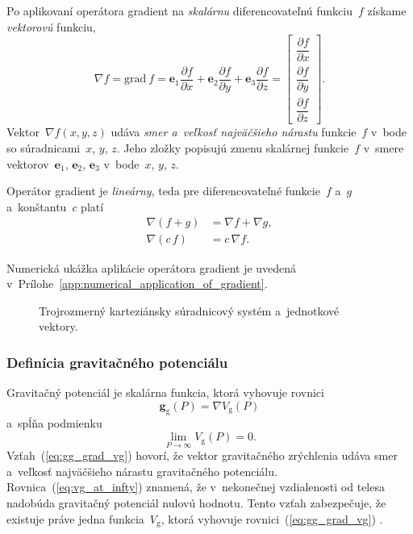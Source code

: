\documentclass[a4paper, 12pt]{book}
\newcommand{\grad}{\mathrm{grad}}
\newcommand{\gidx}{\mathrm g}
\let\vec\mathbf
\begin{document}
Po aplikovaní operátora gradient na \emph{skalárnu} diferencovateľnú 
funkciu~$f$ získame \emph{vektorovú} funkciu,
%
\begin{equation}
\nabla f = \grad \ f = \vec e_1 \frac{\partial f}{\partial x} + \vec e_2 
\frac{\partial
f}{\partial y} + \vec e_3 \frac{\partial f}{\partial z} =
\begin{bmatrix}
\dfrac{\partial f}{\partial x} \\[2ex]
\dfrac{\partial f}{\partial y} \\[2ex]
\dfrac{\partial f}{\partial z}
\end{bmatrix}
{.}
\end{equation}
%
Vektor~$\nabla f(x, y, z)$ udáva \emph{smer a~veľkosť najväčšieho nárastu} 
funkcie~$f$ v~bode so súradnicami~$x$, $y$, $z$.  Jeho zložky popisujú zmenu 
skalárnej funkcie~$f$ v~smere vektorov~$\vec e_1$, $\vec e_2$, $\vec e_3$ 
v~bode~$x$, $y$, $z$.

Operátor gradient je \emph{lineárny}, teda pre diferencovateľné funkcie~$f$ 
a~$g$ a~konštantu~$c$ platí
%
\begin{align}
\label{eq:gradient_additivity}
\nabla \left(f + g \right) &= \nabla f + \nabla g{,}\\
%
\label{eq:gradient_homogenity}
\nabla (c \, f) &= c \, \nabla f{.}
\end{align}

Numerická ukážka aplikácie operátora gradient je uvedená 
v~Prílohe~\ref{app:numerical_application_of_gradient}.

\begin{figure}
\centering

\caption{Trojrozmerný karteziánsky súradnicový systém a~jednotkové vektory.}
\label{fig:3d_coord_system}
\end{figure}

\subsubsection{Definícia gravitačného potenciálu}

Gravitačný potenciál je skalárna funkcia, ktorá vyhovuje rovnici 
\parencite{SansoGeoidDetermination}
%
\begin{equation}
\label{eq:gg_grad_vg}
\vec g_\gidx(P) = \nabla V_\gidx(P)
\end{equation}
%
a~spĺňa podmienku
%
\begin{equation}
\label{eq:vg_at_infty}
\lim_{P \to \infty} V_\gidx(P) = 0{.}
\end{equation}
%
Vzťah~(\ref{eq:gg_grad_vg}) hovorí, že vektor gravitačného zrýchlenia udáva 
smer a~veľkosť najväčšieho nárastu gravitačného potenciálu.  
Rovnica~(\ref{eq:vg_at_infty}) znamená, že v~nekonečnej vzdialenosti od telesa 
nadobúda gravitačný potenciál nulovú hodnotu.  Tento vzťah zabezpečuje, že 
existuje práve jedna funkcia~$V_\gidx$, ktorá vyhovuje 
rovnici~(\ref{eq:gg_grad_vg}) \parencite{SansoGeoidDetermination}.
\end{document}
